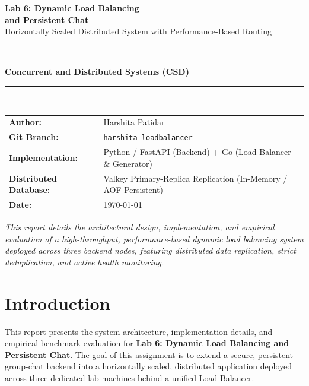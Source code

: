 \documentclass[12pt,a4paper]{article}
\begin{document}
\begin{titlepage}
    \centering
    \vspace*{2cm}
    {\Huge\bfseries\color{accentblue} Lab 6: Dynamic Load Balancing}\\[0.3cm]
    {\Huge\bfseries\color{accentblue} and Persistent Chat}\\[0.5cm]
    {\Large Horizontally Scaled Distributed System with Performance-Based Routing}\\[1.5cm]
    \rule{\textwidth}{1.5pt}\\[0.4cm]
    {\large\bfseries Concurrent and Distributed Systems (CSD)}\\[0.2cm]
    \rule{\textwidth}{1pt}\\[2cm]

    \begin{tabular}{ll}
        \textbf{Author:}          & Harshita Patidar \\[0.3cm]
        \textbf{Git Branch:}      & \texttt{harshita-loadbalancer} \\[0.3cm]
        \textbf{Implementation:}  & Python / FastAPI (Backend) + Go (Load Balancer \& Generator) \\[0.3cm]
        \textbf{Distributed Database:}& Valkey Primary-Replica Replication (In-Memory / AOF Persistent) \\[0.3cm]
        \textbf{Date:}            & \today \\
    \end{tabular}

    \vfill
    {\small\textit{This report details the architectural design, implementation, and empirical evaluation of a high-throughput, performance-based dynamic load balancing system deployed across three backend nodes, featuring distributed data replication, strict deduplication, and active health monitoring.}}
\end{titlepage}

\tableofcontents
\newpage

\section{Introduction}

This report presents the system architecture, implementation details, and empirical benchmark evaluation for \textbf{Lab 6: Dynamic Load Balancing and Persistent Chat}. The goal of this assignment is to extend a secure, persistent group-chat backend into a horizontally scaled, distributed application deployed across three dedicated lab machines behind a unified Load Balancer.
\end{document}
